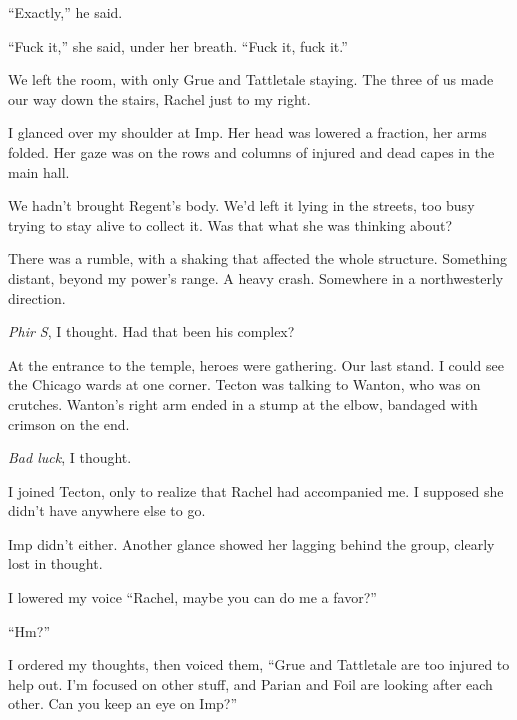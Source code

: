 ``Exactly,'' he said.



``Fuck it,'' she said, under her breath.  ``Fuck it, fuck it.''



We left the room, with only Grue and Tattletale staying.  The three of us made our way down the stairs, Rachel just to my right.



I glanced over my shoulder at Imp.  Her head was lowered a fraction, her arms folded.  Her gaze was on the rows and columns of injured and dead capes in the main hall.



We hadn't brought Regent's body.  We'd left it lying in the streets, too busy trying to stay alive to collect it.  Was that what she was thinking about?



There was a rumble, with a shaking that affected the whole structure.  Something distant, beyond my power's range.  A heavy crash.  Somewhere in a northwesterly direction.



\emph{Phir S}, I thought.  Had that been his complex?



At the entrance to the temple, heroes were gathering.  Our last stand.  I could see the Chicago wards at one corner.  Tecton was talking to Wanton, who was on crutches.  Wanton's right arm ended in a stump at the elbow, bandaged with crimson on the end.



\emph{Bad luck}, I thought.



I joined Tecton, only to realize that Rachel had accompanied me.  I supposed she didn't have anywhere else to go.



Imp didn't either.  Another glance showed her lagging behind the group, clearly lost in thought.



I lowered my voice ``Rachel, maybe you can do me a favor?''



``Hm?''



I ordered my thoughts, then voiced them, ``Grue and Tattletale are too injured to help out.  I'm focused on other stuff, and Parian and Foil are looking after each other.  Can you keep an eye on Imp?''



